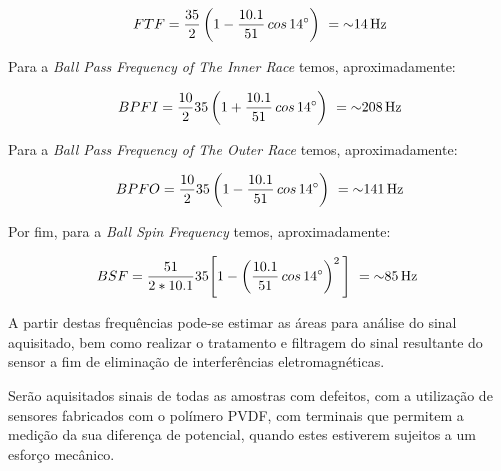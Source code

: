 \documentclass[
	12pt,				
	oneside,			
	a4paper,			
	english,			
	brazil,			
	]{abntex2ppgsi}
\begin{document}
\begin{equation}
	FTF = \frac{35}{2} \left ( 1 - \frac{10.1}{51} \,cos \, \ang{14} \right )  \ = \SI{~14}{{\hertz}}
	\label{eq: FTF no  Rolamento}
\end{equation}


Para a \textit{Ball Pass Frequency of The Inner Race} temos, aproximadamente:

\begin{equation}
	BPFI = \frac{10}{2}35 \left ( 1 + \frac{10.1}{51} \,cos \, \ang{14} \right )  \ = \SI{~208}{{\hertz}}
	\label{eq: BPFI no rolamento}
\end{equation}


Para a \textit{Ball Pass Frequency of The Outer Race} temos, aproximadamente:

\begin{equation}
	BPFO = \frac{10}{2}35 \left ( 1 - \frac{10.1}{51} \,cos \, \ang{14} \right )  \ = \SI{~141}{{\hertz}}
	\label{eq: BPFO no Rolamento}
\end{equation}


Por fim, para a \textit{Ball Spin Frequency} temos, aproximadamente:

\begin{equation}
	BSF = \frac{51}{2*10.1}35 \Bigg[  1 - \left ( \frac{10.1}{51} \,cos \, \ang{14} \right ) ^{2}  \Bigg] \ = \SI{~85}{{\hertz}} \
	\label{eq: BSF no rolamento}
\end{equation}


A partir destas frequências pode-se estimar as áreas para análise do sinal aquisitado, bem como realizar o tratamento e filtragem do sinal resultante do sensor a fim de eliminação de interferências eletromagnéticas. 

Serão aquisitados sinais de todas as amostras com defeitos, com a utilização de sensores fabricados com o polímero PVDF, com terminais que permitem a medição da sua diferença de potencial, quando estes estiverem sujeitos a um esforço mecânico. 
\end{document}
